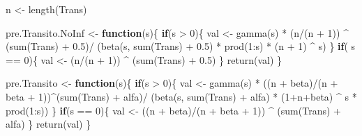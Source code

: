 \documentclass[
  10pt,
  spanish,
]{book}
\newenvironment{Shaded}{\begin{snugshade}}{\end{snugshade}}
\newcommand{\ControlFlowTok}[1]{\textcolor[rgb]{0.13,0.29,0.53}{\textbf{#1}}}
\newcommand{\DecValTok}[1]{\textcolor[rgb]{0.00,0.00,0.81}{#1}}
\newcommand{\FloatTok}[1]{\textcolor[rgb]{0.00,0.00,0.81}{#1}}
\newcommand{\FunctionTok}[1]{\textcolor[rgb]{0.00,0.00,0.00}{#1}}
\newcommand{\NormalTok}[1]{#1}
\newcommand{\OtherTok}[1]{\textcolor[rgb]{0.56,0.35,0.01}{#1}}
\newcommand{\SpecialCharTok}[1]{\textcolor[rgb]{0.00,0.00,0.00}{#1}}
\theoremstyle{definition}
\theoremstyle{definition}
\theoremstyle{definition}
\theoremstyle{definition}
\theoremstyle{remark}
\begin{document}
\begin{Shaded}
\begin{Highlighting}[]
\NormalTok{n }\OtherTok{\textless{}{-}} \FunctionTok{length}\NormalTok{(Trans)}

\NormalTok{pre.Transito.NoInf }\OtherTok{\textless{}{-}} \ControlFlowTok{function}\NormalTok{(s)\{}
  \ControlFlowTok{if}\NormalTok{(s }\SpecialCharTok{\textgreater{}} \DecValTok{0}\NormalTok{)\{}
\NormalTok{    val }\OtherTok{\textless{}{-}} \FunctionTok{gamma}\NormalTok{(s) }\SpecialCharTok{*} 
\NormalTok{      (n}\SpecialCharTok{/}\NormalTok{(n }\SpecialCharTok{+} \DecValTok{1}\NormalTok{)) }\SpecialCharTok{\^{}}\NormalTok{ (}\FunctionTok{sum}\NormalTok{(Trans) }\SpecialCharTok{+} \FloatTok{0.5}\NormalTok{)}\SpecialCharTok{/}
\NormalTok{      (}\FunctionTok{beta}\NormalTok{(s, }\FunctionTok{sum}\NormalTok{(Trans) }\SpecialCharTok{+} \FloatTok{0.5}\NormalTok{) }\SpecialCharTok{*} 
         \FunctionTok{prod}\NormalTok{(}\DecValTok{1}\SpecialCharTok{:}\NormalTok{s) }\SpecialCharTok{*}\NormalTok{ (n }\SpecialCharTok{+} \DecValTok{1}\NormalTok{) }\SpecialCharTok{\^{}}\NormalTok{ s)}
\NormalTok{  \}}
  \ControlFlowTok{if}\NormalTok{( s }\SpecialCharTok{==} \DecValTok{0}\NormalTok{)\{}
\NormalTok{    val }\OtherTok{\textless{}{-}}\NormalTok{ (n}\SpecialCharTok{/}\NormalTok{(n }\SpecialCharTok{+} \DecValTok{1}\NormalTok{)) }\SpecialCharTok{\^{}}\NormalTok{ (}\FunctionTok{sum}\NormalTok{(Trans) }\SpecialCharTok{+} \FloatTok{0.5}\NormalTok{)}
\NormalTok{  \}}
  \FunctionTok{return}\NormalTok{(val)}
\NormalTok{\}}

\NormalTok{pre.Transito }\OtherTok{\textless{}{-}} \ControlFlowTok{function}\NormalTok{(s)\{}
  \ControlFlowTok{if}\NormalTok{(s }\SpecialCharTok{\textgreater{}} \DecValTok{0}\NormalTok{)\{}
\NormalTok{    val }\OtherTok{\textless{}{-}} \FunctionTok{gamma}\NormalTok{(s) }\SpecialCharTok{*} 
\NormalTok{      ((n }\SpecialCharTok{+}\NormalTok{ beta)}\SpecialCharTok{/}\NormalTok{(n }\SpecialCharTok{+}\NormalTok{ beta }\SpecialCharTok{+} \DecValTok{1}\NormalTok{))}\SpecialCharTok{\^{}}\NormalTok{(}\FunctionTok{sum}\NormalTok{(Trans) }\SpecialCharTok{+}\NormalTok{ alfa)}\SpecialCharTok{/}
\NormalTok{      (}\FunctionTok{beta}\NormalTok{(s, }\FunctionTok{sum}\NormalTok{(Trans) }\SpecialCharTok{+}\NormalTok{ alfa) }\SpecialCharTok{*}\NormalTok{ (}\DecValTok{1}\SpecialCharTok{+}\NormalTok{n}\SpecialCharTok{+}\NormalTok{beta) }\SpecialCharTok{\^{}}\NormalTok{ s }\SpecialCharTok{*} 
         \FunctionTok{prod}\NormalTok{(}\DecValTok{1}\SpecialCharTok{:}\NormalTok{s))}
\NormalTok{  \}}
  \ControlFlowTok{if}\NormalTok{(s }\SpecialCharTok{==} \DecValTok{0}\NormalTok{)\{}
\NormalTok{    val }\OtherTok{\textless{}{-}}\NormalTok{ ((n }\SpecialCharTok{+}\NormalTok{ beta)}\SpecialCharTok{/}\NormalTok{(n }\SpecialCharTok{+}\NormalTok{ beta }\SpecialCharTok{+} \DecValTok{1}\NormalTok{)) }\SpecialCharTok{\^{}}\NormalTok{ (}\FunctionTok{sum}\NormalTok{(Trans) }\SpecialCharTok{+}\NormalTok{ alfa)}
\NormalTok{    \}}
  \FunctionTok{return}\NormalTok{(val)}
\NormalTok{\}}


\end{Highlighting}
\end{Shaded}
\end{document}
